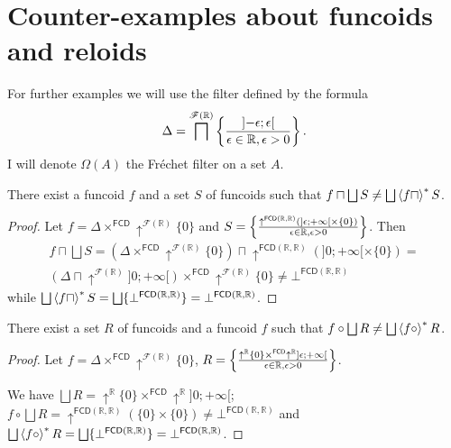 
\chapter{Counter-examples about funcoids and reloids}\label{chap-fcd-counter}

For further examples we will use the filter defined by the formula
\[
\Delta=\bigsqcap^{\mathscr{F}(\mathbb{R})}\left\{ \frac{\mathopen]-\epsilon;\epsilon\mathclose[}{\epsilon\in\mathbb{R},\epsilon>0}\right\}.
\]
I will denote $\Omega(A)$ the Fr\'echet filter on a set $A$.
\begin{example}\label{fcd-not-infdist}
There exist a funcoid $f$ and a set $S$ of funcoids such that $f\sqcap\bigsqcup S\neq\bigsqcup\rsupfun{f\sqcap}S$.\end{example}
\begin{proof}
Let $f=\Delta\times^{\mathsf{FCD}}\uparrow^{\mathscr{F}(\mathbb{R})}\{0\}$
and $S=\left\{ \frac{\uparrow^{\mathsf{FCD}(\mathbb{R},\mathbb{R})}(]\epsilon;+\infty[\times\{0\})}{\epsilon\in\mathbb{R},\epsilon>0}\right\}$.
Then
\begin{multline*}
f\sqcap\bigsqcup S=(\Delta\times^{\mathsf{FCD}}\uparrow^{\mathscr{F}(\mathbb{R})}\{0\})\sqcap\uparrow^{\mathsf{FCD}(\mathbb{R},\mathbb{R})}(]0;+\infty[\times\{0\})=\\
(\Delta\sqcap\uparrow^{\mathscr{F}(\mathbb{R})}]0;+\infty[)\times^{\mathsf{FCD}}\uparrow^{\mathscr{F}(\mathbb{R})}\{0\}\ne\bot^{\mathsf{FCD}(\mathbb{R},\mathbb{R})}
\end{multline*}
while $\bigsqcup\rsupfun{f\sqcap}S=\bigsqcup\{\bot^{\mathsf{FCD}(\mathbb{R},\mathbb{R})}\}=\bot^{\mathsf{FCD}(\mathbb{R},\mathbb{R})}$.\end{proof}
\begin{example}
There exist a set $R$ of funcoids and a funcoid $f$ such that $f\circ\bigsqcup R\neq\bigsqcup\rsupfun{f\circ}R$.\end{example}
\begin{proof}
Let $f=\Delta\times^{\mathsf{FCD}}\uparrow^{\mathscr{F}(\mathbb{R})}\{0\}$,
$R=\left\{ \frac{\uparrow^{\mathbb{R}}\{0\}\times^{\mathsf{FCD}}\uparrow^{\mathbb{R}}]\epsilon;+\infty[}{\epsilon\in\mathbb{R},\epsilon>0}\right\}$.

We have $\bigsqcup R=\uparrow^{\mathbb{R}}\{0\}\times^{\mathsf{FCD}}\uparrow^{\mathbb{R}}]0;+\infty[$;
$f\circ\bigsqcup R=\uparrow^{\mathsf{FCD}(\mathbb{R},\mathbb{R})}(\{0\}\times\{0\})\ne\bot^{\mathsf{FCD}(\mathbb{R},\mathbb{R})}$
and $\bigsqcup\rsupfun{f\circ}R=\bigsqcup\{\bot^{\mathsf{FCD}(\mathbb{R},\mathbb{R})}\}=\bot^{\mathsf{FCD}(\mathbb{R},\mathbb{R})}$.\end{proof}
